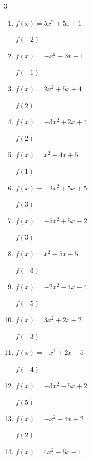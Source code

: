 \begin{multicols}{3}
\begin{enumerate}
$f(3)$
        \phantom{$= 10$}

  \item $f(x)=5x^{2}+5x+1$

$f(-2)$
        \phantom{$= 11$}

  \item $f(x)=-x^{2}-3x-1$

$f(-1)$
        \phantom{$= 1$}

  \item $f(x)=2x^{2}+5x+4$

$f(2)$
        \phantom{$= 22$}

  \item $f(x)=-3x^{2}+2x+4$

$f(2)$
        \phantom{$= -4$}

  \item $f(x)=x^{2}+4x+5$

$f(1)$
        \phantom{$= 10$}

  \item $f(x)=-2x^{2}+5x+5$

$f(3)$
        \phantom{$= 2$}

  \item $f(x)=-5x^{2}+5x-2$

$f(3)$
        \phantom{$= -32$}

  \item $f(x)=x^{2}-5x-5$

$f(-3)$
        \phantom{$= 19$}

\columnbreak %

  \item $f(x)=-2x^{2}-4x-4$

$f(-5)$
        \phantom{$= -34$}

  \item $f(x)=3x^{2}+2x+2$

$f(-3)$
        \phantom{$= 23$}

  \item $f(x)=-x^{2}+2x-5$

$f(-4)$
        \phantom{$= -29$}

  \item $f(x)=-3x^{2}-5x+2$

$f(5)$
        \phantom{$= -98$}

  \item $f(x)=-x^{2}-4x+2$

$f(2)$
        \phantom{$= -10$}

  \item $f(x)=4x^{2}-5x-1$


\end{enumerate}
\end{multicols}
